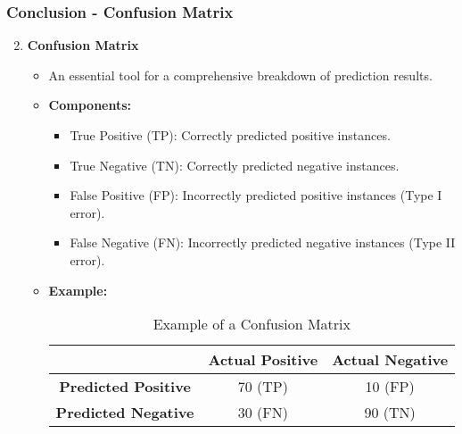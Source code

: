 \documentclass[aspectratio=169]{beamer}
\begin{document}
\begin{frame}[fragile]
    \frametitle{Conclusion - Confusion Matrix}
    \begin{enumerate}
        \setcounter{enumi}{1}
        \item \textbf{Confusion Matrix}
        \begin{itemize}
            \item An essential tool for a comprehensive breakdown of prediction results.
            \item \textbf{Components:}
            \begin{itemize}
                \item True Positive (TP): Correctly predicted positive instances.
                \item True Negative (TN): Correctly predicted negative instances.
                \item False Positive (FP): Incorrectly predicted positive instances (Type I error).
                \item False Negative (FN): Incorrectly predicted negative instances (Type II error).
            \end{itemize}
            \item \textbf{Example:}
            \begin{table}[h]
                \centering
                \begin{tabular}{|c|c|c|}
                    \hline
                    & \textbf{Actual Positive} & \textbf{Actual Negative} \\
                    \hline
                    \textbf{Predicted Positive} & 70 (TP) & 10 (FP) \\
                    \hline
                    \textbf{Predicted Negative} & 30 (FN) & 90 (TN) \\
                    \hline
                \end{tabular}
                \caption{Example of a Confusion Matrix}
            \end{table}
        \end{itemize}
    \end{enumerate}
\end{frame}
\end{document}
